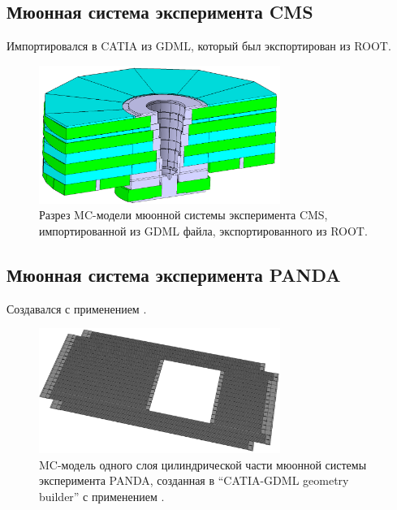 \subsection{Мюонная система эксперимента CMS}\label{sec:secCmsMuon}



Импортировался в CATIA из GDML, который был экспортирован из ROOT.

\begin{figure}[H]
\centering
\includegraphics[width=0.7\textwidth]{pictures/CMS_MUON.png}
\caption{Разрез MC-модели мюонной системы эксперимента CMS, импортированной из GDML файла, экспортированного из ROOT.}
\label{fig:CmsMuon}
\end{figure}

\subsection{Мюонная система эксперимента PANDA}\label{sec:secPandaMuon}

Создавался с применением .

\begin{figure}[H]
\centering
\includegraphics[width=0.7\textwidth]{pictures/PANDA_layer.png}
\caption{MC-модель одного слоя цилиндрической части мюонной системы эксперимента PANDA, созданная в ``CATIA-GDML geometry builder'' с применением .}
\label{fig:PandaMuonLayer}
\end{figure}


